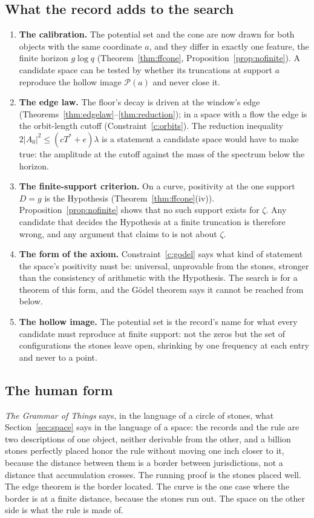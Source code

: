 \documentclass[11pt]{article}
\theoremstyle{definition}
\theoremstyle{remark}
\newcommand{\Tst}{T^{*}}
\newcommand{\PS}{\mathcal P}
\begin{document}
\subsection{What the record adds to the search}
\begin{enumerate}
\item \textbf{The calibration.} The potential set and the cone are now drawn for both objects with the same coordinate $a$, and they differ in exactly one feature, the finite horizon $g\log q$ (Theorem~\ref{thm:ffcone}, Proposition~\ref{prop:nofinite}). A candidate space can be tested by whether its truncations at support $a$ reproduce the hollow image $\PS(a)$ and never close it.
\item \textbf{The edge law.} The floor's decay is driven at the window's edge (Theorems~\ref{thm:edgelaw}--\ref{thm:reduction}); in a space with a flow the edge is the orbit-length cutoff (Constraint~\ref{c:orbits}). The reduction inequality $2|A_0|^2\le(c\Tst+e)\lambda$ is a statement a candidate space would have to make true: the amplitude at the cutoff against the mass of the spectrum below the horizon.
\item \textbf{The finite-support criterion.} On a curve, positivity at the one support $D=g$ is the Hypothesis (Theorem~\ref{thm:ffcone}(iv)). Proposition~\ref{prop:nofinite} shows that no such support exists for $\zeta$. Any candidate that decides the Hypothesis at a finite truncation is therefore wrong, and any argument that claims to is not about $\zeta$.
\item \textbf{The form of the axiom.} Constraint~\ref{c:godel} says what kind of statement the space's positivity must be: universal, unprovable from the stones, stronger than the consistency of arithmetic with the Hypothesis. The search is for a theorem of this form, and the Gödel theorem says it cannot be reached from below.
\item \textbf{The hollow image.} The potential set is the record's name for what every candidate must reproduce at finite support: not the zeros but the set of configurations the stones leave open, shrinking by one frequency at each entry and never to a point.
\end{enumerate}

\subsection{The human form}
\emph{The Grammar of Things} \cite{grammar} says, in the language of a circle of stones, what Section~\ref{sec:space} says in the language of a space: the records and the rule are two descriptions of one object, neither derivable from the other, and a billion stones perfectly placed honor the rule without moving one inch closer to it, because the distance between them is a border between jurisdictions, not a distance that accumulation crosses. The running proof is the stones placed well. The edge theorem is the border located. The curve is the one case where the border is at a finite distance, because the stones run out. The space on the other side is what the rule is made of.
\end{document}
